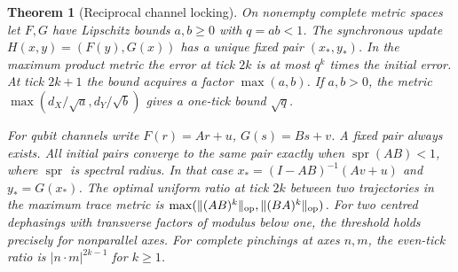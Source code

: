 \documentclass[aps,pra,onecolumn,superscriptaddress,nofootinbib,10pt]{revtex4-2}
\newtheorem{theorem}{Theorem}
\theoremstyle{definition}
\theoremstyle{remark}
\begin{document}
\begin{theorem}[Reciprocal channel locking]\label{ob:locking}
On nonempty complete metric spaces let $F,G$ have Lipschitz bounds
$a,b\ge0$ with $q=ab<1$. The synchronous update
$H(x,y)=(F(y),G(x))$ has a unique fixed pair $(x_*,y_*)$.
In the maximum product metric the error at tick $2k$ is at most $q^k$
times the initial error. At tick $2k+1$ the bound acquires a factor
$\max(a,b)$. If $a,b>0$, the metric $\max(d_X/\sqrt a,d_Y/\sqrt b)$
gives a one-tick bound $\sqrt q$.

For qubit channels write $F(r)=Ar+u$, $G(s)=Bs+v$.
A fixed pair always exists. All initial pairs converge to the same
pair exactly when $\operatorname{spr}(AB)<1$, where $\operatorname{spr}$
is spectral radius. In that case $x_*=(I-AB)^{-1}(Av+u)$ and $y_*=G(x_*)$.
The optimal uniform ratio at tick $2k$ between two trajectories in
the maximum trace metric is $\max(\|(AB)^k\|_{\rm op},\|(BA)^k\|_{\rm op})$.
For two centred dephasings with transverse factors of modulus below
one, the threshold holds precisely for nonparallel axes. For complete
pinchings at axes $n,m$, the even-tick ratio is $|n\cdot m|^{2k-1}$ for $k\ge1$.
\end{theorem}
\end{document}
